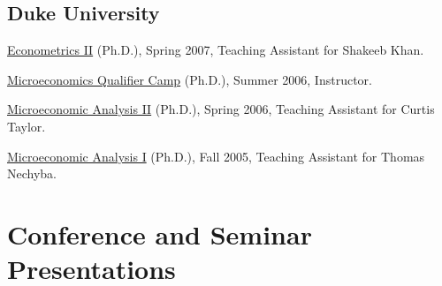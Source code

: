 \documentclass[10pt,letterpaper]{article}
\renewenvironment{itemize}{
  \begin{list}{}{
    \setlength{\leftmargin}{1.5em}
    \setlength{\itemsep}{0.25em}
    \setlength{\parskip}{0pt}
    \setlength{\parsep}{0.25em}
  }
}{
  \end{list}
}
\begin{document}
\subsection*{Duke University}

\begin{itemize}
\item \href{http://jblevins.org/courses/econ342s07/}{Econometrics II} (Ph.D.), Spring 2007, Teaching Assistant for Shakeeb Khan.
\item \href{http://jblevins.org/courses/qualcamp06/}{Microeconomics Qualifier Camp} (Ph.D.), Summer 2006, Instructor.
\item \href{http://jblevins.org/courses/econ302s06/}{Microeconomic Analysis II} (Ph.D.), Spring 2006, Teaching Assistant for Curtis Taylor.
\item \href{http://jblevins.org/courses/econ301f05/}{Microeconomic Analysis I} (Ph.D.), Fall 2005, Teaching Assistant for Thomas Nechyba.
\end{itemize}

\section*{Conference and Seminar Presentations}
\end{document}
